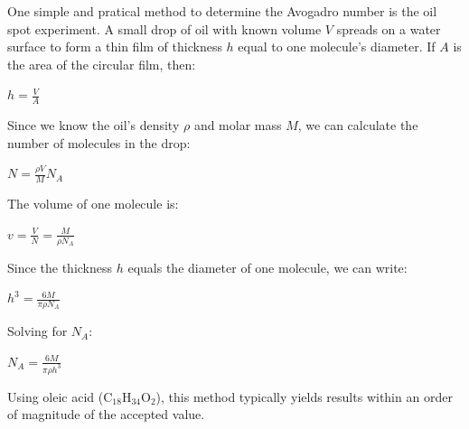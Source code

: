 \documentclass[
  a4paper,
]{book}
\begin{document}
\begin{tcolorbox}[enhanced jigsaw, coltitle=black, title=\textcolor{quarto-callout-note-color}{\faInfo}\hspace{0.5em}{Oil spot experiment}, colframe=quarto-callout-note-color-frame, toprule=.15mm, opacitybacktitle=0.6, left=2mm, opacityback=0, breakable, toptitle=1mm, bottomtitle=1mm, leftrule=.75mm, arc=.35mm, titlerule=0mm, colbacktitle=quarto-callout-note-color!10!white, rightrule=.15mm, bottomrule=.15mm, colback=white]

One simple and pratical method to determine the Avogadro number is the
oil spot experiment. A small drop of oil with known volume \(V\) spreads
on a water surface to form a thin film of thickness \(h\) equal to one
molecule's diameter. If \(A\) is the area of the circular film, then:

\(h = \frac{V}{A}\)

Since we know the oil's density \(\rho\) and molar mass \(M\), we can
calculate the number of molecules in the drop:

\(N = \frac{\rho V}{M} N_A\)

The volume of one molecule is:

\(v = \frac{V}{N} = \frac{M}{\rho N_A}\)

Since the thickness \(h\) equals the diameter of one molecule, we can
write:

\(h^3 = \frac{6M}{\pi \rho N_A}\)

Solving for \(N_A\):

\(N_A = \frac{6M}{\pi \rho h^3}\)

Using oleic acid (\(\mathrm{C_{18}H_{34}O_2}\)), this method typically
yields results within an order of magnitude of the accepted value.

\end{tcolorbox}
\end{document}
